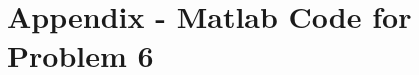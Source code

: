 {


\newpage
\section{Appendix - Matlab Code for Problem 6}
\label{appendix:problem5}














































%





}
